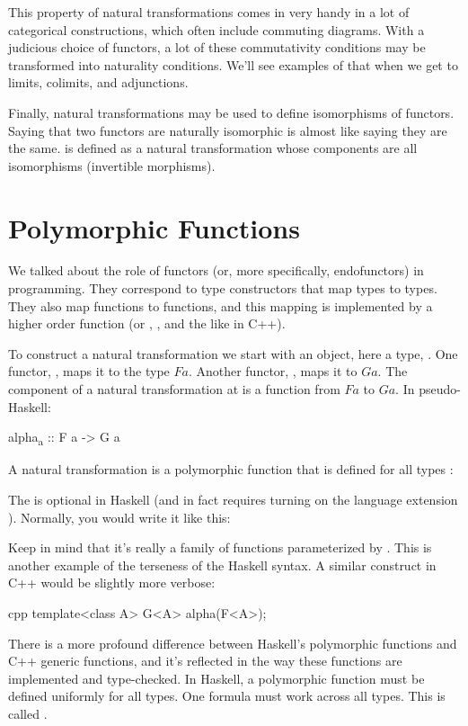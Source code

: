 \noindent
This property of natural transformations comes in very handy in a lot of
categorical constructions, which often include commuting diagrams. With
a judicious choice of functors, a lot of these commutativity conditions
may be transformed into naturality conditions. We'll see examples of
that when we get to limits, colimits, and adjunctions.

Finally, natural transformations may be used to define isomorphisms of
functors. Saying that two functors are naturally isomorphic is almost
like saying they are the same.  is defined as
a natural transformation whose components are all isomorphisms
(invertible morphisms).

\section{Polymorphic Functions}

We talked about the role of functors (or, more specifically,
endofunctors) in programming. They correspond to type constructors that
map types to types. They also map functions to functions, and this
mapping is implemented by a higher order function  (or
, , and the like in C++).

To construct a natural transformation we start with an object, here a
type, . One functor, , maps it to the type
$F a$. Another functor, , maps it to $G a$.
The component of a natural transformation  at 
is a function from $F a$ to $G a$. In pseudo-Haskell:

\begin{snipv}
alpha\textsubscript{a} :: F a -> G a
\end{snipv}
A natural transformation is a polymorphic function that is defined for
all types :

The  is optional in Haskell (and in fact requires
turning on the language extension ). Normally,
you would write it like this:

Keep in mind that it's really a family of functions parameterized by
. This is another example of the terseness of the Haskell
syntax. A similar construct in C++ would be slightly more verbose:

\begin{snip}{cpp}
template<class A> G<A> alpha(F<A>);
\end{snip}
There is a more profound difference between Haskell's polymorphic
functions and C++ generic functions, and it's reflected in the way these
functions are implemented and type-checked. In Haskell, a polymorphic
function must be defined uniformly for all types. One formula must work
across all types. This is called .

